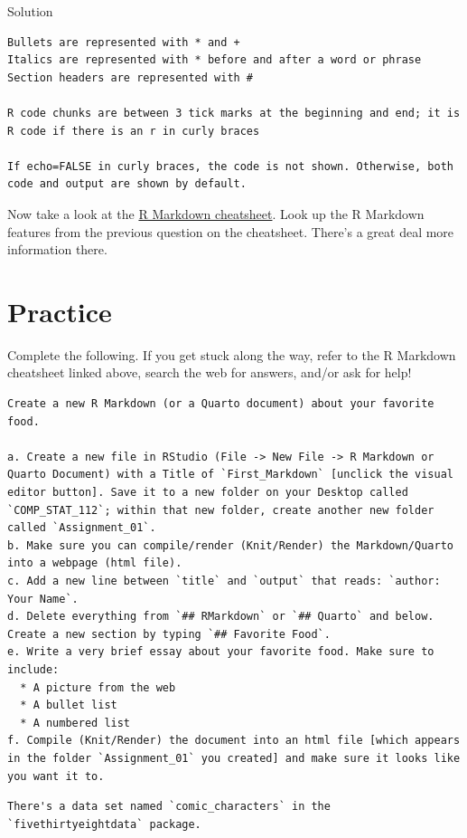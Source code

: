 \documentclass[
  letterpaper,
  DIV=11,
  numbers=noendperiod]{scrreprt}
\begin{document}
Solution

\begin{verbatim}
Bullets are represented with * and +
Italics are represented with * before and after a word or phrase
Section headers are represented with #

R code chunks are between 3 tick marks at the beginning and end; it is R code if there is an r in curly braces
  
If echo=FALSE in curly braces, the code is not shown. Otherwise, both code and output are shown by default.
\end{verbatim}

Now take a look at the
\href{https://github.com/rstudio/cheatsheets/raw/main/rmarkdown-2.0.pdf}{R
Markdown cheatsheet}. Look up the R Markdown features from the previous
question on the cheatsheet. There's a great deal more information there.

\section{Practice}\label{practice}

Complete the following. If you get stuck along the way, refer to the R
Markdown cheatsheet linked above, search the web for answers, and/or ask
for help!

\begin{verbatim}
Create a new R Markdown (or a Quarto document) about your favorite food.    

a. Create a new file in RStudio (File -> New File -> R Markdown or Quarto Document) with a Title of `First_Markdown` [unclick the visual editor button]. Save it to a new folder on your Desktop called `COMP_STAT_112`; within that new folder, create another new folder called `Assignment_01`.  
b. Make sure you can compile/render (Knit/Render) the Markdown/Quarto into a webpage (html file).  
c. Add a new line between `title` and `output` that reads: `author: Your Name`.
d. Delete everything from `## RMarkdown` or `## Quarto` and below. Create a new section by typing `## Favorite Food`.
e. Write a very brief essay about your favorite food. Make sure to include:    
  * A picture from the web    
  * A bullet list    
  * A numbered list  
f. Compile (Knit/Render) the document into an html file [which appears in the folder `Assignment_01` you created] and make sure it looks like you want it to.
\end{verbatim}

\begin{verbatim}
There's a data set named `comic_characters` in the `fivethirtyeightdata` package.
\end{verbatim}
\end{document}
